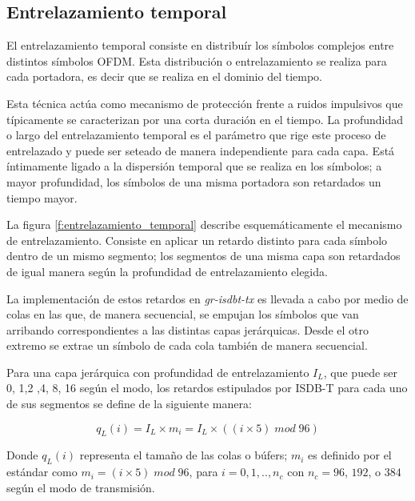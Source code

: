\subsection{Entrelazamiento temporal}

El entrelazamiento temporal consiste en distribuír los s\'imbolos complejos entre distintos s\'imbolos OFDM. Esta distribuci\'on o entrelazamiento se realiza para cada portadora, es decir que se realiza en el dominio del tiempo.

Esta t\'ecnica act\'ua como mecanismo de protecci\'on frente a ruidos impulsivos que t\'ipicamente se caracterizan por una corta duraci\'on en el tiempo. La profundidad o largo del entrelazamiento temporal es el par\'ametro que rige este proceso de entrelazado y puede ser seteado de manera independiente para cada capa. Est\'a \'intimamente ligado a la dispersi\'on temporal que se realiza en los s\'imbolos; a mayor profundidad, los s\'imbolos de una misma portadora son retardados un tiempo mayor.

La figura \ref{f:entrelazamiento_temporal} describe esquem\'aticamente el mecanismo de entrelazamiento. Consiste en aplicar un retardo distinto para cada s\'imbolo dentro de un mismo segmento; los segmentos de una misma capa son retardados de igual manera seg\'un la profundidad de entrelazamiento elegida. 

La implementaci\'on de estos retardos en \textit{gr-isdbt-tx} es llevada a cabo por medio de colas en las que, de manera secuencial, se empujan los s\'imbolos que van arribando correspondientes a las distintas capas jer\'arquicas. Desde el otro extremo se extrae un s\'imbolo de cada cola tambi\'en de manera secuencial. 

Para una capa jer\'arquica con profundidad de entrelazamiento $I_L$, que puede ser 0, 1,2 ,4, 8, 16 seg\'un el modo, los retardos estipulados por ISDB-T para cada uno de sus segmentos se define de la siguiente manera:

\begin{equation}
q_L(i) = I_L \times m_i = I_L \times ((i \times 5) \; mod \; 96)
\end{equation}

Donde $q_L(i)$ representa el tamaño de las colas o búfers; $m_i$ es definido por el est\'andar como $m_i = (i \times 5) \; mod \; 96$, para $i = 0, 1,..,n_c$ con $n_c = 96$, $192$, o $384$ seg\'un el modo de transmisi\'on. 


